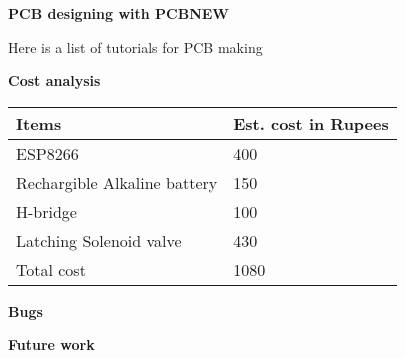 \documentclass[16pt]{article}
\begin{document}
{\textbf{PCB designing with
PCBNEW}}

Here is a list of tutorials for PCB making


\vspace{17cm}

{\LARGE{\textbf{Cost analysis}}}

\vspace{1cm}
\begin{tabular}{|m{5cm}|m{3.5cm}|}
	\hline
	{\bf Items} & {\bf Est. cost in Rupees}\\ \hline
	ESP8266 & 400 \\ \hline
	Rechargible Alkaline battery & 150 \\ \hline
	H-bridge & 100 \\ \hline 
	Latching Solenoid valve & 430 \\ \hline
	Total cost & 1080 \\ \hline 
\end{tabular} 

\vspace{15cm}
{\LARGE{\textbf{Bugs}}}


\vspace{19cm}
{\LARGE{\textbf{Future work}}}
\end{document}
